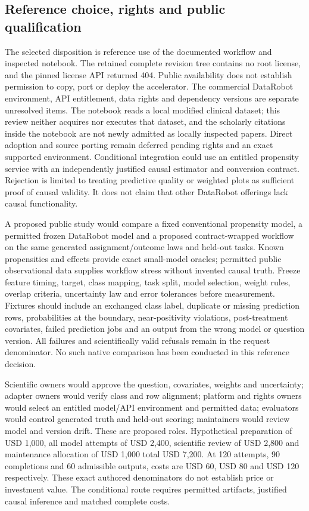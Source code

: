 \subsection{Reference choice, rights and public qualification}
The selected disposition is reference use of the documented workflow and
inspected notebook. The retained complete revision tree contains no root
license, and the pinned license API returned 404. Public availability does
not establish permission to copy, port or deploy the accelerator. The
commercial DataRobot environment, API entitlement, data rights and dependency
versions are separate unresolved items. The notebook reads a local modified
clinical dataset; this review neither acquires nor executes that dataset, and
the scholarly citations inside the notebook are not newly admitted as locally
inspected papers. Direct adoption and source porting remain deferred pending
rights and an exact supported environment. Conditional integration could use
an entitled propensity service with an independently justified causal
estimator and conversion contract. Rejection is limited to treating predictive
quality or weighted plots as sufficient proof of causal validity. It does not
claim that other DataRobot offerings lack causal functionality.
\citep{exec13_ch_datarobot,exec25_datarobot_notebook,exec25_datarobot_choice}

A proposed public study would compare a fixed conventional propensity model,
a permitted frozen DataRobot model and a proposed contract-wrapped workflow on
the same generated assignment/outcome laws and held-out tasks. Known
propensities and effects provide exact small-model oracles; permitted public
observational data supplies workflow stress without invented causal truth.
Freeze feature timing, target, class mapping, task split, model selection,
weight rules, overlap criteria, uncertainty law and error tolerances before
measurement. Fixtures should include an exchanged class label, duplicate or
missing prediction rows, probabilities at the boundary, near-positivity
violations, post-treatment covariates, failed prediction jobs and an output
from the wrong model or question version. All failures and scientifically
valid refusals remain in the request denominator. No such native comparison
has been conducted in this reference decision.~\citep{exec25_datarobot_choice}

Scientific owners would approve the question, covariates, weights and
uncertainty; adapter owners would verify class and row alignment; platform and
rights owners would select an entitled model/API environment and permitted
data; evaluators would control generated truth and held-out scoring;
maintainers would review model and version drift. These are proposed roles.
Hypothetical preparation of USD 1,000, all model attempts of USD 2,400,
scientific review of USD 2,800 and maintenance allocation of USD 1,000 total
USD 7,200. At 120 attempts, 90 completions and 60 admissible outputs, costs are
USD 60, USD 80 and USD 120 respectively. These exact authored denominators do
not establish price or investment value. The conditional route requires
permitted artifacts, justified causal inference and matched complete costs.
\citep{exec25_datarobot_choice}


